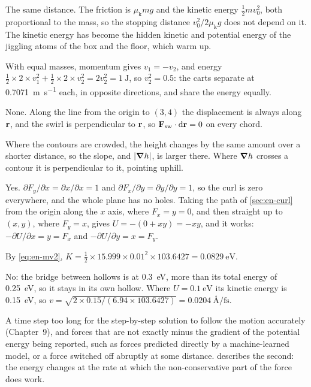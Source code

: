 The same distance. The friction is
$\mu_{\mathrm{k}}mg$ and the kinetic energy $\frac12 mv_0^2$, both
proportional to the mass, so the stopping distance $v_0^2/2\mu_{\mathrm{k}}
g$ does not depend on it. The kinetic energy has become the hidden
kinetic and potential energy of the jiggling atoms of the box and the
floor, which warm up.

With equal masses, momentum gives $v_1 = -v_2$,
and energy $\frac12\times2\times v_1^2 + \frac12\times2\times v_2^2 =
2v_2^2 = \SI{1}{\joule}$, so $v_2^2 = 0.5$: the carts separate at \SI{0.7071}{\metre\per\second} each, in
opposite directions, and share the energy equally.

None. Along the line from the origin to $(3, 4)$
the displacement is always along $\bm{\mathrm{r}}$, and the swirl is
perpendicular to $\bm{\mathrm{r}}$, so $\bm{\mathrm{F}}_{\mathrm{sw}}\cdot\mathrm{d}\bm{\mathrm{r}} = 0$ on
every chord.

Where the contours are crowded, the height
changes by the same amount over a shorter distance, so the slope, and
$\lvert\bm{\nabla} h\rvert$, is larger there. Where $\bm{\nabla} h$ crosses a contour
it is perpendicular to it, pointing uphill.

Yes. $\partial F_y/\partial x = \partial x/\partial
x = 1$ and $\partial F_x/\partial y = \partial y/\partial y = 1$, so the
curl is zero everywhere, and the whole plane has no holes. Taking the
path of \cref{sec:en-curl} from the origin along the $x$ axis, where $F_x
= y = 0$, and then straight up to $(x, y)$, where $F_y = x$, gives $U =
-(0 + xy) = -xy$, and it works: $-\partial U/\partial x = y = F_x$ and $-\partial U/\partial y = x
= F_y$.

By \cref{eq:en-mv2}, $K = \frac12\times15.999
\times0.01^2\times103.6427 = \SI{0.0829}{\electronvolt}$.

No: the bridge between hollows is at
\SI{0.3}{\electronvolt}, more than its total energy of
\SI{0.25}{\electronvolt}, so it stays in its own hollow. Where $U =
\SI{0.1}{\electronvolt}$ its kinetic energy is \SI{0.15}{\electronvolt},
so $v = \sqrt{2\times0.15/(6.94\times103.6427)} =
\SI{0.0204}{\angstrom\per\femto\second}$.

A time step too long for the step-by-step solution to follow
the motion accurately (Chapter~9), and forces that are not exactly minus
the gradient of the potential energy being reported, such as forces
predicted directly by a machine-learned model, or a force switched off
abruptly at some distance.  describes the second:
the energy changes at the rate at which the non-conservative part of the
force does work.
